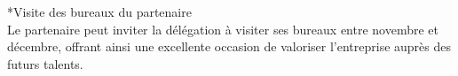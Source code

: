 *Visite des bureaux du partenaire\\
Le partenaire peut inviter la délégation à visiter ses bureaux entre novembre et décembre, offrant ainsi une excellente occasion de valoriser l'entreprise auprès des futurs talents.\\